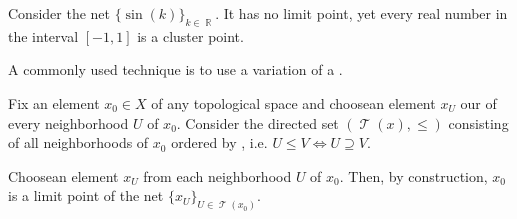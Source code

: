 \begin{example}\label{ex:cluster_points/sine}
  Consider the net \( \{ \sin(k) \}_{k \in \BbbR} \). It has no limit point, yet every real number in the interval \( [-1, 1] \) is a cluster point.
\end{example}

\begin{example}\label{ex:reverse_inclusion_net}
  A commonly used technique is to use a variation of a .

  Fix an element \( x_0 \in X \) of any topological space and choose\DNE an element \( x_U \) our of every neighborhood \( U \) of \( x_0 \). Consider the directed set \( (\mscrT(x), \leq) \) consisting of all neighborhoods of \( x_0 \) ordered by , i.e. \( U \leq V \iff U \supseteq V \).

  Choose\DNE an element \( x_U \) from each neighborhood \( U \) of \( x_0 \). Then, by construction, \( x_0 \) is a limit point of the net \( \{ x_U \}_{U \in \mscrT(x_0)} \).
\end{example}

